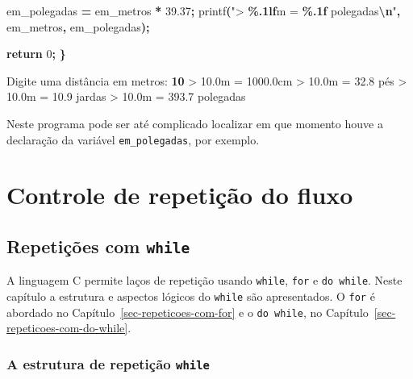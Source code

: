 \documentclass[
  11pt,
  a4paper,
]{scrbook}
\newenvironment{Shaded}{\begin{snugshade}}{\end{snugshade}}
\newcommand{\ControlFlowTok}[1]{\textcolor[rgb]{0.13,0.29,0.53}{\textbf{#1}}}
\newcommand{\DecValTok}[1]{\textcolor[rgb]{0.00,0.00,0.81}{#1}}
\newcommand{\FloatTok}[1]{\textcolor[rgb]{0.00,0.00,0.81}{#1}}
\newcommand{\KeywordTok}[1]{\textcolor[rgb]{0.13,0.29,0.53}{\textbf{#1}}}
\newcommand{\NormalTok}[1]{#1}
\newcommand{\OperatorTok}[1]{\textcolor[rgb]{0.81,0.36,0.00}{\textbf{#1}}}
\newcommand{\SpecialCharTok}[1]{\textcolor[rgb]{0.81,0.36,0.00}{\textbf{#1}}}
\newcommand{\StringTok}[1]{\textcolor[rgb]{0.31,0.60,0.02}{#1}}
\begin{document}
\begin{Shaded}
\begin{Highlighting}[]
\NormalTok{    em\_polegadas }\OperatorTok{=}\NormalTok{ em\_metros }\OperatorTok{*} \FloatTok{39.37}\OperatorTok{;}
\NormalTok{    printf}\OperatorTok{(}\StringTok{"\textgreater{} }\SpecialCharTok{\%.1lf}\StringTok{m = }\SpecialCharTok{\%.1f}\StringTok{ polegadas}\SpecialCharTok{\textbackslash{}n}\StringTok{"}\OperatorTok{,}\NormalTok{ em\_metros}\OperatorTok{,}\NormalTok{ em\_polegadas}\OperatorTok{);}

    \ControlFlowTok{return} \DecValTok{0}\OperatorTok{;}
\OperatorTok{\}}
\end{Highlighting}
\end{Shaded}

\begin{Shaded}
\begin{Highlighting}[]
\NormalTok{Digite uma distância em metros: }\KeywordTok{ 10 }
\NormalTok{\textgreater{} 10.0m = 1000.0cm}
\NormalTok{\textgreater{} 10.0m = 32.8 pés}
\NormalTok{\textgreater{} 10.0m = 10.9 jardas}
\NormalTok{\textgreater{} 10.0m = 393.7 polegadas}
\end{Highlighting}
\end{Shaded}

Neste programa pode ser até complicado localizar em que momento houve a
declaração da variável \texttt{em\_polegadas}, por exemplo.

\part{Controle de repetição do fluxo}

\chapter{\texorpdfstring{Repetições com
\texttt{while}}{Repetições com while}}\label{sec-repeticoes-com-while}

A linguagem C permite laços de repetição usando \texttt{while},
\texttt{for} e \texttt{do\ while}. Neste capítulo a estrutura e aspectos
lógicos do \texttt{while} são apresentados. O \texttt{for} é abordado no
Capítulo~\ref{sec-repeticoes-com-for} e o \texttt{do\ while}, no
Capítulo~\ref{sec-repeticoes-com-do-while}.

\section{\texorpdfstring{A estrutura de repetição
\texttt{while}}{A estrutura de repetição while}}\label{a-estrutura-de-repetiuxe7uxe3o-while}
\end{document}
